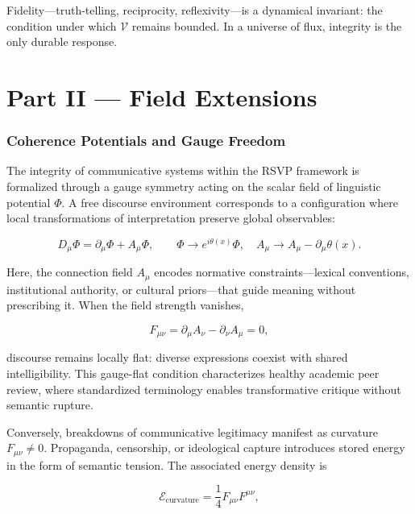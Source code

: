 \documentclass[12pt,a4paper]{article}
\begin{document}
Fidelity—truth-telling, reciprocity, reflexivity—is a dynamical invariant: the condition under which $\mathcal{V}$ remains bounded. In a universe of flux, integrity is the only durable response.

\clearpage
\part*{Part II — Field Extensions}

\section{Coherence Potentials and Gauge Freedom}

The integrity of communicative systems within the RSVP framework is formalized through a gauge symmetry acting on the scalar field of linguistic potential $\Phi$. A free discourse environment corresponds to a configuration where local transformations of interpretation preserve global observables:

\begin{equation}
D_\mu \Phi = \partial_\mu \Phi + A_\mu \Phi, \qquad
\Phi \rightarrow e^{i\theta(x)} \Phi, \quad
A_\mu \rightarrow A_\mu - \partial_\mu \theta(x).
\end{equation}

Here, the connection field $A_\mu$ encodes normative constraints—lexical conventions, institutional authority, or cultural priors—that guide meaning without prescribing it. When the field strength vanishes,

\begin{equation}
F_{\mu\nu} = \partial_\mu A_\nu - \partial_\nu A_\mu = 0,
\end{equation}

discourse remains locally flat: diverse expressions coexist with shared intelligibility. This gauge-flat condition characterizes healthy academic peer review, where standardized terminology enables transformative critique without semantic rupture.

Conversely, breakdowns of communicative legitimacy manifest as curvature $F_{\mu\nu} \neq 0$. Propaganda, censorship, or ideological capture introduces stored energy in the form of semantic tension. The associated energy density is

\begin{equation}
\mathcal{E}_{\text{curvature}} = \frac{1}{4} F_{\mu\nu} F^{\mu\nu},
\end{equation}
\end{document}
